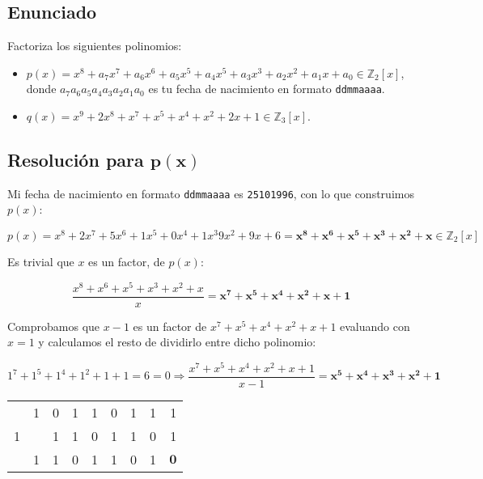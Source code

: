 \section{}\label{ej-1-4}

\subsection*{Enunciado}

Factoriza los siguientes polinomios:

\begin{itemize}
	\item
		$p(x) = x^8 + a_{7}x^7 + a_{6}x^6 + a_{5}x^5 + a_{4}x^5 + a_{3}x^3 + a_{2}x^2 + a_{1}x + a_0 \in\mathbb{Z}_2[x]$, donde $a_{7}a_{6}a_{5}a_{4}a_{3}a_{2}a_{1}a_{0}$ es tu fecha de nacimiento en formato \texttt{ddmmaaaa}.
	\item
		$q(x) = x^9 + 2x^8 + x^7 + x^5 + x^4 + x^2 + 2x + 1 \in\mathbb{Z}_3[x]$.
\end{itemize}

\subsection*{Resolución para $\boldsymbol{p(x)}$}

Mi fecha de nacimiento en formato \texttt{ddmmaaaa} es \texttt{25101996}, con lo que construimos $p(x)$:

\[p(x) = x^8 + 2x^7 + 5x^6 + 1x^5 + 0x^4 + 1x^3 9x^2 + 9x + 6 = \boldsymbol{x^8 + x^6 + x^5 + x^3 + x^2 + x} \in\mathbb{Z}_2[x]\]

Es trivial que $x$ es un factor, de $p(x)$:

\[\frac{x^8 + x^6 + x^5 + x^3 + x^2 + x}{x} = \boldsymbol{x^7 + x^5 + x^4 + x^2 + x + 1}\]

Comprobamos que $x-1$ es un factor de $x^7 + x^5 + x^4 + x^2 + x + 1$ evaluando con $x = 1$ y calculamos el resto de dividirlo entre dicho polinomio:

\[1^7 + 1^5 + 1^4 + 1^2 + 1 + 1 = 6 = 0 \Rightarrow \frac{x^7 + x^5 + x^4 + x^2 + x + 1}{x-1} = \boldsymbol{x^5 + x^4 + x^3 + x^2 + 1}\]

\begin{center}
\setlength{\tabcolsep}{1ex}
\begin{tabular}{r | r r r r r r r r}
     & 1 & 0 & 1 & 1 & 0 & 1 & 1 & 1 \\
	1 &   & 1 & 1 & 0 & 1 & 1 & 0 & 1 \\
	\hline
	  & 1 & 1 & 0 & 1 & 1 & 0 & 1 & $\boldsymbol{0}$
\end{tabular}
\end{center}

